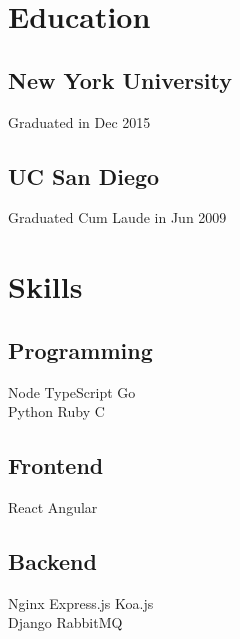 \documentclass[letterpaper]{deedy-resume} %
\begin{document}
\begin{minipage}[t]{0.33\textwidth} %


\section{Education} 

\subsection{New York University}

Graduated in Dec 2015

\sectionspace %


\subsection{UC San Diego}

Graduated Cum Laude in Jun 2009

\sectionspace %


\section{Skills}
\subsection{Programming}
Node \textbullet{}
TypeScript \textbullet{} 
Go \\
Python \textbullet{}
Ruby \textbullet{}  
C
\sectionspace
\subsection{Frontend}
React \textbullet{}
Angular
\sectionspace
\subsection{Backend}
Nginx \textbullet{}
Express.js \textbullet{}
Koa.js \\
Django \textbullet
RabbitMQ
\sectionspace

\end{minipage}
\end{document}
